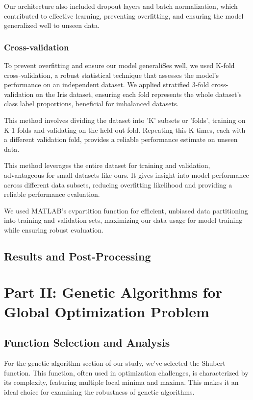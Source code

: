 \documentclass[conference]{inc/IEEEtran}
\begin{document}
Our architecture also included dropout layers and batch normalization, which contributed to effective learning, preventing overfitting, and ensuring the model generalized well to unseen data.

\subsubsection{Cross-validation}

To prevent overfitting and ensure our model generaliSes well, we used K-fold cross-validation, a robust statistical technique that assesses the model's performance on an independent dataset. We applied stratified 3-fold cross-validation on the Iris dataset, ensuring each fold represents the whole dataset's class label proportions, beneficial for imbalanced datasets.

This method involves dividing the dataset into 'K' subsets or 'folds', training on K-1 folds and validating on the held-out fold. Repeating this K times, each with a different validation fold, provides a reliable performance estimate on unseen data.

This method leverages the entire dataset for training and validation, advantageous for small datasets like ours. It gives insight into model performance across different data subsets, reducing overfitting likelihood and providing a reliable performance evaluation.

We used MATLAB's cvpartition function for efficient, unbiased data partitioning into training and validation sets, maximizing our data usage for model training while ensuring robust evaluation.

\subsection{Results and Post-Processing}

\section{Part II: Genetic Algorithms for Global Optimization Problem}

\subsection{Function Selection and Analysis}

For the genetic algorithm section of our study, we've selected the Shubert function. This function, often used in optimization challenges, is characterized
by its complexity, featuring multiple local minima and maxima. This makes it an ideal choice for examining the robustness of genetic algorithms.
\end{document}
